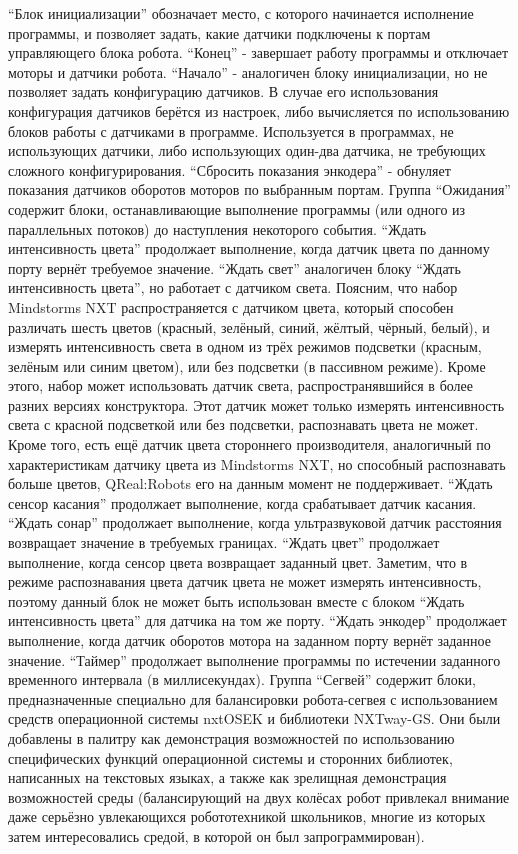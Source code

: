 “Блок инициализации” обозначает место, с которого начинается исполнение программы, и позволяет задать, какие датчики подключены к портам управляющего блока робота.
“Конец” - завершает работу программы и отключает моторы и датчики робота.
“Начало” - аналогичен блоку инициализации, но не позволяет задать конфигурацию датчиков. В случае его использования конфигурация датчиков берётся из настроек, либо вычисляется по использованию блоков работы с датчиками в программе. Используется в программах, не использующих датчики, либо использующих один-два датчика, не требующих сложного конфигурирования.
“Сбросить показания энкодера” - обнуляет показания датчиков оборотов моторов по выбранным портам.
Группа “Ожидания” содержит блоки, останавливающие выполнение программы (или одного из параллельных потоков) до наступления некоторого события.
“Ждать интенсивность цвета” продолжает выполнение, когда датчик цвета по данному порту вернёт требуемое значение.
“Ждать свет” аналогичен блоку “Ждать интенсивность цвета”, но работает с датчиком света. Поясним, что набор Mindstorms NXT распространяется с датчиком цвета, который способен различать шесть цветов (красный, зелёный, синий, жёлтый, чёрный, белый), и измерять интенсивность света в одном из трёх режимов подсветки (красным, зелёным или синим цветом), или без подсветки (в пассивном режиме). Кроме этого, набор может использовать датчик света, распространявшийся в более разних версиях конструктора. Этот датчик может только измерять интенсивность света с красной подсветкой или без подсветки, распознавать цвета не может. Кроме того, есть ещё датчик цвета стороннего производителя, аналогичный по характеристикам датчику цвета из Mindstorms NXT, но способный распознавать больше цветов, QReal:Robots его на данным момент не поддерживает.
“Ждать сенсор касания” продолжает выполнение, когда срабатывает датчик касания.
“Ждать сонар” продолжает выполнение, когда ультразвуковой датчик расстояния возвращает значение в требуемых границах. 
“Ждать цвет” продолжает выполнение, когда сенсор цвета возвращает заданный цвет. Заметим, что в режиме распознавания цвета датчик цвета не может измерять интенсивность, поэтому данный блок не может быть использован вместе с блоком “Ждать интенсивность цвета” для датчика на том же порту.
“Ждать энкодер” продолжает выполнение, когда датчик оборотов мотора на заданном порту вернёт заданное значение.
“Таймер” продолжает выполнение программы по истечении заданного временного интервала (в миллисекундах).
Группа “Сегвей” содержит блоки, предназначенные специально для балансировки робота-сегвея с использованием средств операционной системы nxtOSEK и библиотеки NXTway-GS. Они были добавлены в палитру как демонстрация возможностей по использованию специфических функций операционной системы и сторонних библиотек, написанных на текстовых языках, а также как зрелищная демонстрация возможностей среды (балансирующий на двух колёсах робот привлекал внимание даже серьёзно увлекающихся робототехникой школьников, многие из которых затем интересовались средой, в которой он был запрограммирован).
